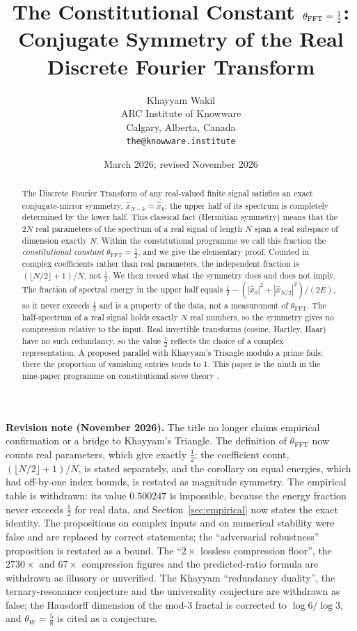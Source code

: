 \documentclass[12pt]{article}
\title{The Constitutional Constant $\thetaFFT = \tfrac{1}{2}$:\\
  Conjugate Symmetry of the Real\\
  Discrete Fourier Transform}
\author{Khayyam Wakil \\
  \small ARC Institute of Knowware \\
  \small Calgary, Alberta, Canada \\
  \small \texttt{the@knowware.institute}}
\date{March 2026; revised November 2026}
\theoremstyle{definition}
\newcommand{\abs}[1]{\left|#1\right|}
\newcommand{\thetaFFT}{\theta_{\mathrm{FFT}}}
\begin{document}
\maketitle

\begin{abstract}
The Discrete Fourier Transform of any real-valued finite signal satisfies
an exact conjugate-mirror symmetry, $\hat{x}_{N-k} = \overline{\hat{x}_k}$:
the upper half of its spectrum is completely determined by the lower half.
This classical fact (Hermitian symmetry) means that the $2N$ real
parameters of the spectrum of a real signal of length $N$ span a real
subspace of dimension exactly $N$.  Within the constitutional programme we
call this fraction the \emph{constitutional constant}
$\thetaFFT = \tfrac{1}{2}$, and we give the elementary proof.  Counted in
complex coefficients rather than real parameters, the independent
fraction is $(\lfloor N/2 \rfloor + 1)/N$, not $\tfrac{1}{2}$.
We then record what the symmetry does and does not imply.  The fraction
of spectral energy in the upper half equals
$\tfrac{1}{2} - (\abs{\hat{x}_0}^2 + \abs{\hat{x}_{N/2}}^2)/(2E)$, so it
never exceeds $\tfrac{1}{2}$ and is a property of the data, not a
measurement of $\thetaFFT$.  The half-spectrum of a real signal holds
exactly $N$ real numbers, so the symmetry gives no compression relative
to the input.  Real invertible transforms (cosine, Hartley, Haar) have no
such redundancy, so the value $\tfrac{1}{2}$ reflects the choice of a
complex representation.  A proposed parallel with Khayyam's Triangle
modulo a prime fails: there the proportion of vanishing entries tends
to $1$.
This paper is the ninth in the nine-paper programme on constitutional
sieve theory \cite{Wakil2026Forcing,Wakil2026Khayyam,Wakil2026SphericalCow,
Wakil2026Eisenstein,Wakil2026Ramanujan,Wakil2026Shannon,
Wakil2026ConditionW3,Wakil2026Bias}.
\end{abstract}

\noindent\textbf{Revision note (November 2026).}
The title no longer claims empirical confirmation or a bridge to
Khayyam's Triangle.  The definition of $\thetaFFT$ now counts real
parameters, which give exactly $\tfrac{1}{2}$; the coefficient count,
$(\lfloor N/2 \rfloor + 1)/N$, is stated separately, and the corollary on
equal energies, which had off-by-one index bounds, is restated as
magnitude symmetry.  The empirical table is withdrawn: its value
$0.500247$ is impossible, because the energy fraction never exceeds
$\tfrac{1}{2}$ for real data, and Section~\ref{sec:empirical} now states
the exact identity.  The propositions on complex inputs and on numerical
stability were false and are replaced by correct statements; the
``adversarial robustness'' proposition is restated as a bound.  The
``$2\times$ lossless compression floor'', the $2730\times$ and $67\times$
compression figures and the predicted-ratio formula are withdrawn as
illusory or unverified.  The Khayyam ``redundancy duality'', the
ternary-resonance conjecture and the universality conjecture are
withdrawn as false; the Hausdorff dimension of the mod-3 fractal is
corrected to $\log 6/\log 3$, and $\theta_W = \tfrac{5}{8}$ is cited as a
conjecture.
\end{document}
